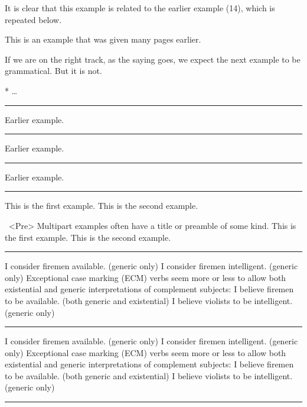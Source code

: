 \documentclass[12pt]{article}
\begin{document}
\noindent It is clear that this example is related to the earlier
example (14), which is repeated below.

\ex[exno=14]
This is an example that was given many pages earlier.\xe

\noindent If we are on the right track, as the saying goes,
we expect the next example to be grammatical.  But it is not.

\ex[exno=96] * \dots\xe
\endgroup
\bigskip

\hrule\medskip

\begingroup
\ex[exno=$\Delta$] Earlier example.\xe
\endgroup
\bigskip

\hrule\medskip

\begingroup
\ex[exno={14, repeated}] Earlier example.\xe
\endgroup
\bigskip

\hrule\medskip

\begingroup
\ex[exno={14, repeated},exnoformat={[X]}] Earlier example.\xe
\endgroup
\bigskip

\hrule\medskip

\begingroup
\pex
\a This is the first example.
\a This is the second example.
\xe

\pex~<Pre> Multipart examples often have a title or preamble of some
kind.
\a This is the first example.
\a This is the second example.
\xe
\endgroup
\bigskip

\hrule\medskip

\begingroup
\keepexcntlocal {}
\pex
\a I consider firemen available. (generic only)
\a I consider firemen intelligent. (generic only)
\xe
Exceptional case marking (ECM) verbs seem more or less to allow both
existential and generic interpretations of complement subjects:
\pex
\a I believe firemen to be available. (both generic and existential)
\a I believe violists to be intelligent. (generic only)
\xe
\endgroup
\bigskip

\hrule\medskip

\begingroup
\keepexcntlocal {}
\pex[sampleexno=(\anextx)]
\a I consider firemen available. (generic only)
\a I consider firemen intelligent. (generic only)
\xe
Exceptional case marking (ECM) verbs seem more or less to allow both
existential and generic interpretations of complement subjects:
\pex
\a I believe firemen to be available. (both generic and existential)
\a I believe violists to be intelligent. (generic only)
\xe
\endgroup
\bigskip

\hrule\medskip

\begingroup
{}
\endgroup
\bigskip
\end{document}
